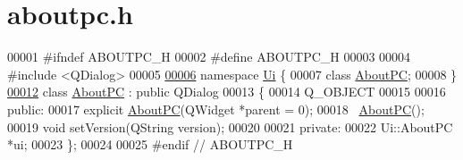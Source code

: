 \hypertarget{aboutpc_8h_source}{}\section{aboutpc.\+h}

\begin{DoxyCode}
00001 \textcolor{preprocessor}{#ifndef ABOUTPC\_H}
00002 \textcolor{preprocessor}{#define ABOUTPC\_H}
00003 
00004 \textcolor{preprocessor}{#include <QDialog>}
00005 
\hypertarget{aboutpc_8h_source.tex_l00006}{}\hyperlink{namespace_ui}{00006} \textcolor{keyword}{namespace }\hyperlink{namespace_ui}{Ui} \{
00007 \textcolor{keyword}{class }\hyperlink{class_about_p_c}{AboutPC};
00008 \}
\hypertarget{aboutpc_8h_source.tex_l00012}{}\hyperlink{class_about_p_c}{00012} \textcolor{keyword}{class }\hyperlink{class_about_p_c}{AboutPC} : \textcolor{keyword}{public} QDialog
00013 \{
00014     Q\_OBJECT
00015 
00016 \textcolor{keyword}{public}:
00017     \textcolor{keyword}{explicit} \hyperlink{class_about_p_c}{AboutPC}(QWidget *parent = 0);
00018     ~\hyperlink{class_about_p_c}{AboutPC}();
00019     \textcolor{keywordtype}{void} setVersion(QString version);
00020 
00021 \textcolor{keyword}{private}:
00022     Ui::AboutPC *ui;
00023 \};
00024 
00025 \textcolor{preprocessor}{#endif // ABOUTPC\_H}
\end{DoxyCode}
